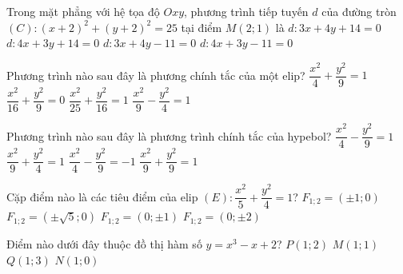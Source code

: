\begin{ex}%
	Trong mặt phẳng với hệ tọa độ $Oxy$, phương trình tiếp tuyến $d$ của đường tròn $(C)\colon (x+2)^2+(y+2)^2=25$ tại điểm $M(2;1)$ là
	\choice
	{$d \colon 3x+4y+14=0$}
	{$d \colon 4x+3y+14=0$}
	{$d \colon 3x+4y-11=0$}
	{\True $d \colon 4x+3y-11=0$}
\end{ex}

\begin{ex}%
	Phương trình nào sau đây là phương chính tắc của một elip?
	\choice
	{$\dfrac{x^2}{4}+\dfrac{y^2}{9}=1$}
	{$\dfrac{x^2}{16}+\dfrac{y^2}{9}=0$}
	{\True $\dfrac{x^2}{25}+\dfrac{y^2}{16}=1$}
	{$\dfrac{x^2}{9}-\dfrac{y^2}{4}=1$}
\end{ex}

\begin{ex}%
	Phương trình nào sau đây là phương trình chính tắc của hypebol?
	\choice
	{\True $\dfrac{x^2}{4}-\dfrac{y^2}{9}=1$}
	{$\dfrac{x^2}{9}+\dfrac{y^2}{4}=1$}
	{$\dfrac{x^2}{4}-\dfrac{y^2}{9}=-1$}
	{$\dfrac{x^2}{9}+\dfrac{y^2}{9}=1$}
\end{ex}

\begin{ex}%
	Cặp điểm nào là các tiêu điểm của elip $(E)\colon \dfrac{x^2}{5}+\dfrac{y^2}{4}=1$?
	\choice
	{\True $F_{1;2}=(\pm1;0)$}
	{$F_{1;2}=(\pm\sqrt{5};0)$}
	{$F_{1;2}=(0;\pm1)$}
	{$F_{1;2}=(0;\pm2)$}
\end{ex}

\begin{ex}%
	Điểm nào dưới đây thuộc đồ thị hàm số $y=x^3-x+2$?
	\choice
	{\True $P(1;2)$}
	{$M(1;1)$}
	{$Q(1;3)$}
	{$N(1;0)$}
\end{ex}

